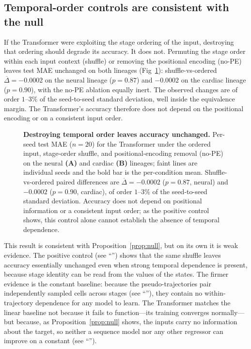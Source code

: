 \documentclass[10pt,letterpaper]{article}
\begin{document}
\subsection*{Temporal-order controls are consistent with the null}
\label{subsec:res_temporal}

If the Transformer were exploiting the stage ordering of the input, destroying that ordering should degrade its accuracy. It does not. Permuting the stage order within each input context (shuffle) or removing the positional encoding (no-PE) leaves test MAE unchanged on both lineages (Fig~\ref{fig:temporal}): shuffle-vs-ordered $\overline{\Delta}=-0.0002$ on the neural lineage ($p=0.87$) and $-0.0002$ on the cardiac lineage ($p=0.90$), with the no-PE ablation equally inert. The observed changes are of order $1$--$3\%$ of the seed-to-seed standard deviation, well inside the equivalence margin. The Transformer's accuracy therefore does not depend on the positional encoding or on a consistent input order.

\begin{figure}[!h]
\caption{\textbf{Destroying temporal order leaves accuracy unchanged.} Per-seed test MAE ($n=20$) for the Transformer under the ordered input, stage-order shuffle, and positional-encoding removal (no-PE) on the neural \textbf{(A)} and cardiac \textbf{(B)} lineages; faint lines are individual seeds and the bold bar is the per-condition mean. Shuffle-vs-ordered paired differences are $\overline{\Delta}=-0.0002$ ($p=0.87$, neural) and $-0.0002$ ($p=0.90$, cardiac), of order $1$--$3\%$ of the seed-to-seed standard deviation. Accuracy does not depend on positional information or a consistent input order; as the positive control shows, this control alone cannot establish the absence of temporal dependence.}
\label{fig:temporal}
\end{figure}

This result is consistent with Proposition~\ref{prop:null}, but on its own it is weak evidence. The positive control (see ``'') shows that the same shuffle leaves accuracy essentially unchanged even when strong temporal dependence is present, because stage identity can be read from the values of the states. The firmer evidence is the constant baseline: because the pseudo-trajectories pair independently sampled cells across stages (see ``''), they contain no within-trajectory dependence for any model to learn. The Transformer matches the linear baseline not because it fails to function---its training converges normally---but because, as Proposition~\ref{prop:null} shows, the inputs carry no information about the target, so neither a sequence model nor any other regressor can improve on a constant (see ``'').
\end{document}
